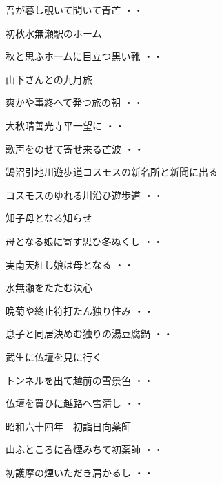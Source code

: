 \begin{shiika}吾が暮し覗いて聞いて青芒
\hfill{・・}\end{shiika}
\vspace{0.6cm}
初秋水無瀬駅のホーム
\begin{shiika}秋と思ふホームに目立つ黒い靴
\hfill{・・}\end{shiika}
\vspace{0.6cm}
山下さんとの九月旅
\begin{shiika}爽かや事終へて発つ旅の朝
\hfill{・・}\end{shiika}
\begin{shiika}大秋晴善光寺平一望に
\hfill{・・}\end{shiika}
\begin{shiika}歌声をのせて寄せ来る芒波
\hfill{・・}\end{shiika}
\vspace{0.6cm}
鵠沼引地川遊歩道コスモスの新名所と新聞に出る
\begin{shiika}コスモスのゆれる川沿ひ遊歩道
\hfill{・・}\end{shiika}
\vspace{0.6cm}
知子母となる知らせ
\begin{shiika}母となる娘に寄す思ひ冬ぬくし
\hfill{・・}\end{shiika}
\begin{shiika}実南天紅し娘は母となる
\hfill{・・}\end{shiika}
\vspace{0.6cm}
水無瀬をたたむ決心
\begin{shiika}晩菊や終止符打たん独り住み
\hfill{・・}\end{shiika}
\begin{shiika}息子と同居決めむ独りの湯豆腐鍋
\hfill{・・}\end{shiika}
\vspace{0.6cm}
武生に仏壇を見に行く
\begin{shiika}トンネルを出て越前の雪景色
\hfill{・・}\end{shiika}
\begin{shiika}仏壇を買ひに越路へ雪清し
\hfill{・・}\end{shiika}
\vspace{0.6cm}
昭和六十四年　初詣日向薬師
\begin{shiika}山ふところに香煙みちて初薬師
\hfill{・・}\end{shiika}
\begin{shiika}初護摩の煙いただき肩かるし
\hfill{・・}\end{shiika}
